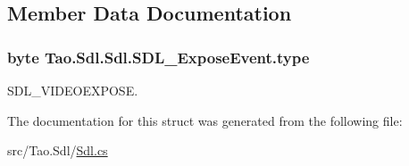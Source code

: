 \subsection{Member Data Documentation}
\hypertarget{struct_tao_1_1_sdl_1_1_sdl_1_1_s_d_l___expose_event_a35b4d97e4271af3c11acb392975cda25}{
\subsubsection[{type}]{\setlength{\rightskip}{0pt plus 5cm}byte {\bf Tao.Sdl.Sdl.SDL\_\-ExposeEvent.type}}}
\label{struct_tao_1_1_sdl_1_1_sdl_1_1_s_d_l___expose_event_a35b4d97e4271af3c11acb392975cda25}


SDL\_\-VIDEOEXPOSE. 



The documentation for this struct was generated from the following file:\begin{DoxyCompactItemize}
\item 
src/Tao.Sdl/\hyperlink{_sdl_8cs}{Sdl.cs}\end{DoxyCompactItemize}
